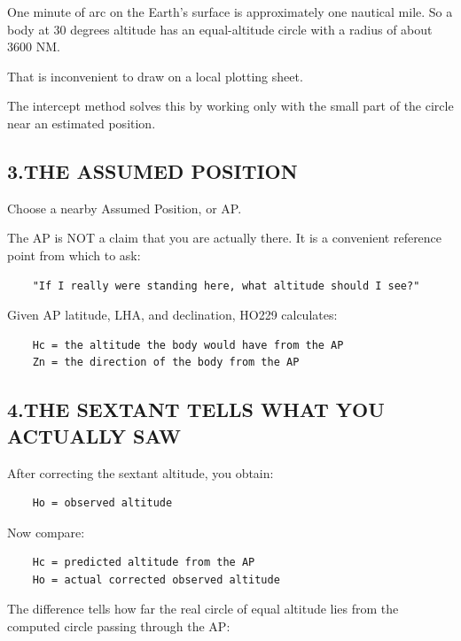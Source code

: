 \documentclass[11pt]{article}
\begin{document}
One minute of arc on the Earth's surface is approximately one nautical mile. So a body at 30 degrees altitude has an equal-altitude circle with a radius of about 3600 NM.

That is inconvenient to draw on a local plotting sheet.

The intercept method solves this by working only with the small part of the circle near an estimated position.

\subsection*{3.\quad THE ASSUMED POSITION}

Choose a nearby Assumed Position, or AP.

The AP is NOT a claim that you are actually there. It is a convenient reference point from which to ask:

\begin{verbatim}
    "If I really were standing here, what altitude should I see?"
\end{verbatim}

Given AP latitude, LHA, and declination, HO229 calculates:

\begin{verbatim}
    Hc = the altitude the body would have from the AP
    Zn = the direction of the body from the AP
\end{verbatim}

\subsection*{4.\quad THE SEXTANT TELLS WHAT YOU ACTUALLY SAW}

After correcting the sextant altitude, you obtain:

\begin{verbatim}
    Ho = observed altitude
\end{verbatim}

Now compare:

\begin{verbatim}
    Hc = predicted altitude from the AP
    Ho = actual corrected observed altitude
\end{verbatim}

The difference tells how far the real circle of equal altitude lies from the computed circle passing through the AP:
\end{document}
